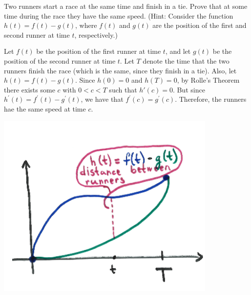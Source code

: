 \documentclass[nooutcomes]{ximera}
\begin{document}
\begin{problem}
  Two runners start a race at the same time and finish in a tie.
  Prove that at some time during the race they have the same speed.
  (Hint:  Consider the function $h(t)=f(t)-g(t)$, where $f(t)$ and $g(t)$ are the position of the first and second runner at time $t$, respectively.)
  \begin{freeResponse}
    Let $f(t)$ be the position of the first runner at time $t$, and let $g(t)$ be the position of the second runner at time $t$.
    Let $T$ denote the time that the two runners finish the race (which is the same, since they finish in a tie).
    Also, let $h(t) = f(t) - g(t)$.
    Since $h(0) = 0$ and $h(T) = 0$, by Rolle's Theorem there exists some $c$ with $0 < c < T$ such that $h'(c)=0$.
    But since $h^\prime (t) = f^\prime (t) - g^\prime (t)$, we have that $f^\prime (c) = g^\prime (c)$.
    Therefore, the runners hae the same speed at time $c$.  

    \begin{image}
      \includegraphics[scale=.5]{Images/Figure6.png}
    \end{image}
  \end{freeResponse}
\end{problem}
\end{document}
